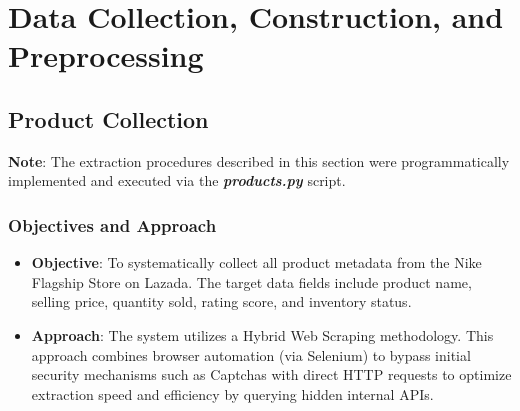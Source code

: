 \section{Data Collection, Construction, and Preprocessing}
    \subsection{Product Collection}
    \textbf{Note}: The extraction procedures described in this section were programmatically implemented and executed via the \textbf{\textit{products.py}} script.
        \subsubsection{Objectives and Approach}
        \begin{itemize}
            \item \textbf{Objective}: To systematically collect all product metadata from the Nike Flagship Store on Lazada. The target data fields include product name, selling price, quantity sold, rating score, and inventory status.
            \item \textbf{Approach}: The system utilizes a Hybrid Web Scraping methodology. This approach combines browser automation (via Selenium) to bypass initial security mechanisms such as Captchas with direct HTTP requests to optimize extraction speed and efficiency by querying hidden internal APIs.
        \end{itemize}

